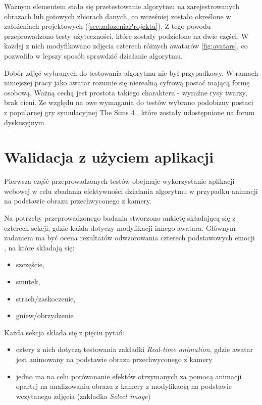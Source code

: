 Ważnym elementem stało się przetestowanie algorytmu na zarejestrowanych obrazach lub gotowych zbiorach danych, co wcześniej zostało określone w założeniach projektowych (\ref{sec:zalozeniaProjektu}). Z tego powodu przeprowadzono testy użyteczności, które zostały podzielone na dwie części. W każdej z nich modyfikowano zdjęcia czterech różnych awatarów \ref{fig:avatars}, co pozwoliło w lepszy sposób sprawdzić działanie algorytmu. 

Dobór zdjęć wybranych do testowania algorytmu nie był przypadkowy. W ramach niniejszej pracy jako awatar rozumie się nierealną cyfrową postać mającą formę osobową. Ważną cechą jest prostota takiego charakteru - wyraźne rysy twarzy, brak cieni. Ze względu na owe wymagania do testów wybrano podobizny postaci z popularnej gry symulacyjnej The Sims 4 \cite{avatars}, które zostały udostępnione na forum dyskusyjnym.


\section{Walidacja z użyciem aplikacji}
Pierwsza część przeprowadzonych testów obejmuje wykorzystanie aplikacji webowej w celu zbadania efektywności działania algorytmu w przypadku animacji na podstawie obrazu przechwyconego z kamery. 

Na potrzeby przeprowadzonego badania stworzono ankietę składającą się z czterech sekcji, gdzie każda dotyczy modyfikacji innego awatara. Głównym zadaniem ma być ocena rezultatów odwzorowania czterech podstawowych emocji \cite{emotions}, na które składają się:

\begin{itemize}
    \item szczęście,
    \item smutek,
    \item strach/zaskoczenie,
    \item gniew/obrzydzenie
\end{itemize}

Każda sekcja składa się z pięciu pytań:
\begin{itemize}
    \item cztery z nich dotyczą testowania zakładki \textit{Real-time animation}, gdzie awatar jest animowany na podstawie obrazu przechwyconego z kamery
    \item jedno ma na celu porówananie efektów otrzymanych za pomocą animacji opartej na analizowaniu obrazu z kamery z modyfikacją na podstawie wczytanego zdjęcia (zakładka \textit{Select image})
\end{itemize}

